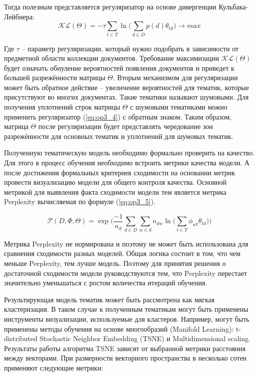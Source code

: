 Тогда полезным представляется регуляризатор на основе дивергенции Кульбака-Лейбнера: 
\begin{equation} 
\label{eq:op3_4}
\mathcal{KL}(\Theta)= -\tau \sum_{t \in T} \ln \bigg( \sum_{d \in D} p \left( d \right) \theta_{td} \bigg) \rightarrow max
\end{equation}

Где $\tau$ – параметр регуляризации, который нужно подобрать в зависимости от предметной области коллекции документов. 
Требование максимизации $\mathcal{KL}(\Theta)$ будет означать обнуление вероятностей появления документов и приведет к большей разрежённости матрицы $\Theta$.
Вторым механизмом для регуляризации может быть обратное действие – увеличение вероятностей для тематик, которые присутствуют во многих документах. 
Такие тематики называют шумовыми. 
Для получения уплотнений строк матрицы  $\Theta$  с шумовыми тематиками можно применить регуляризатор (\ref{eq:op3_4})  с обратным знаком. 
Таким образом, матрица $\Theta$ после регуляризации будет представлять чередование зон разрежённости для основных тематик и уплотнений для шумовых тематик. 

Полученную тематическую модель необходимо формально проверить на качество. 
Для этого в процесс обучения необходимо встроить метрики качества модели. 
А после достижения формальных критериев сходимости на основании метрик провести визуализацию модели для общего контроля качества. 
Основной метрикой для выявления факта сходимости модели тем является метрика Perplexity вычисляемая по формуле (\ref{eq:op3_5}).

\begin{equation} 
\label{eq:op3_5}
\mathcal{P}(D, \Phi, \Theta) = \exp \bigg( \frac{-1}{n_d} \sum_{d \in D}  \sum_{w \in d}  n_{dw} \ln \bigg( \sum_{t \in T} \phi_{wt} \theta_{td} \bigg ) \bigg)
\end{equation}

Метрика Perplexity не нормирована и поэтому не может быть использована для сравнения сходимости разных моделей. 
Общая логика состоит в том, что чем меньше Perplexity, тем лучше модель. 
Поэтому для принятия решения о достаточной сходимости модели руководствуются тем, что Perplexity перестает значительно уменьшаться с ростом количества итераций обучения.

Результирующая модель тематик может быть рассмотрена как мягкая кластеризация. 
В таком случае к полученным тематикам могут быть применены инструменты визуализации, используемые для кластеров. 
Например, могут быть применены методы обучения на основе многообразий (Manifold Learning): t-distributed Stochastic Neighbor Embedding (TSNE)  и Multidimensional scaling. 
Результаты работы алгоритма TSNE зависят от выбранной метрики расстояния между векторами. 
При размерности векторного пространства в несколько сотен применяют следующие метрики: 


